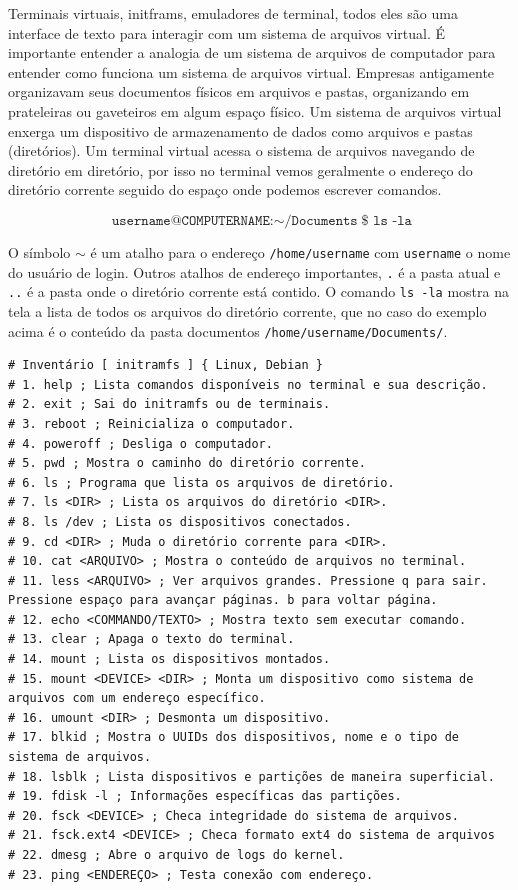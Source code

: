\documentclass[12pt,a4paper]{article}
\begin{document}
Terminais virtuais, initframs, emuladores de terminal, todos eles são uma interface de texto para interagir com um sistema de arquivos virtual. É importante entender a analogia de um sistema de arquivos de computador para entender como funciona um sistema de arquivos virtual. Empresas antigamente organizavam seus documentos físicos em arquivos e pastas, organizando em prateleiras ou gaveteiros em algum espaço físico. Um sistema de arquivos virtual enxerga um dispositivo de armazenamento de dados como arquivos e pastas (diretórios). Um terminal virtual acessa o sistema de arquivos navegando de diretório em diretório, por isso no terminal vemos geralmente o endereço do diretório corrente seguido do espaço onde podemos escrever comandos.

$$ \texttt{username@COMPUTERNAME:$\sim$/Documents} \$ \texttt{ ls -la} $$

O símbolo $\sim$ é um atalho para o endereço \texttt{/home/username} com \texttt{username} o nome do usuário de login. Outros atalhos de endereço importantes, \texttt{.} é a pasta atual e \texttt{..} é a pasta onde o diretório corrente está contido. O comando \texttt{ls -la} mostra na tela a lista de todos os arquivos do diretório corrente, que no caso do exemplo acima é o conteúdo da pasta documentos \texttt{/home/username/Documents/}.\\

\begin{lstlisting}
# Inventário [ initramfs ] { Linux, Debian }
# 1. help ; Lista comandos disponíveis no terminal e sua descrição.
# 2. exit ; Sai do initramfs ou de terminais.
# 3. reboot ; Reinicializa o computador.
# 4. poweroff ; Desliga o computador.
# 5. pwd ; Mostra o caminho do diretório corrente. 
# 6. ls ; Programa que lista os arquivos de diretório. 
# 7. ls <DIR> ; Lista os arquivos do diretório <DIR>. 
# 8. ls /dev ; Lista os dispositivos conectados.
# 9. cd <DIR> ; Muda o diretório corrente para <DIR>.
# 10. cat <ARQUIVO> ; Mostra o conteúdo de arquivos no terminal.
# 11. less <ARQUIVO> ; Ver arquivos grandes. Pressione q para sair. Pressione espaço para avançar páginas. b para voltar página.
# 12. echo <COMMANDO/TEXTO> ; Mostra texto sem executar comando.
# 13. clear ; Apaga o texto do terminal.
# 14. mount ; Lista os dispositivos montados. 
# 15. mount <DEVICE> <DIR> ; Monta um dispositivo como sistema de arquivos com um endereço específico.
# 16. umount <DIR> ; Desmonta um dispositivo.
# 17. blkid ; Mostra o UUIDs dos dispositivos, nome e o tipo de sistema de arquivos. 
# 18. lsblk ; Lista dispositivos e partições de maneira superficial.
# 19. fdisk -l ; Informações específicas das partições.
# 20. fsck <DEVICE> ; Checa integridade do sistema de arquivos.
# 21. fsck.ext4 <DEVICE> ; Checa formato ext4 do sistema de arquivos
# 22. dmesg ; Abre o arquivo de logs do kernel.
# 23. ping <ENDEREÇO> ; Testa conexão com endereço. 
\end{lstlisting}
\end{document}
